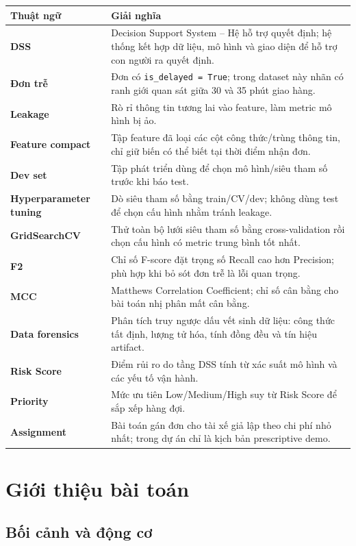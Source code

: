 \documentclass[12pt,a4paper,oneside]{report}
\newcommand{\code}[1]{\nolinkurl{#1}}
\begin{document}
\begin{longtable}{>{\bfseries}p{4.0cm}p{10.2cm}}
\toprule
\textmd{\bfseries Thuật ngữ} & \textbf{Giải nghĩa}\\
\midrule
\endhead
DSS & Decision Support System -- Hệ hỗ trợ quyết định; hệ thống kết hợp dữ
liệu, mô hình và giao diện để hỗ trợ con người ra quyết định.\\
Đơn trễ & Đơn có \code{is\_delayed = True}; trong dataset này nhãn có ranh
giới quan sát giữa 30 và 35 phút giao hàng.\\
Leakage & Rò rỉ thông tin tương lai vào feature, làm metric mô hình bị ảo.\\
Feature compact & Tập feature đã loại các cột công thức/trùng thông tin, chỉ
giữ biến có thể biết tại thời điểm nhận đơn.\\
Dev set & Tập phát triển dùng để chọn mô hình/siêu tham số trước khi báo test.\\
Hyperparameter tuning & Dò siêu tham số bằng train/CV/dev; không dùng test để
chọn cấu hình nhằm tránh leakage.\\
GridSearchCV & Thử toàn bộ lưới siêu tham số bằng cross-validation rồi chọn cấu
hình có metric trung bình tốt nhất.\\
F2 & Chỉ số F-score đặt trọng số Recall cao hơn Precision; phù hợp khi bỏ sót
đơn trễ là lỗi quan trọng.\\
MCC & Matthews Correlation Coefficient; chỉ số cân bằng cho bài toán nhị phân
mất cân bằng.\\
Data forensics & Phân tích truy ngược dấu vết sinh dữ liệu: công thức tất định,
lượng tử hóa, tính đồng đều và tín hiệu artifact.\\
Risk Score & Điểm rủi ro do tầng DSS tính từ xác suất mô hình và các yếu tố
vận hành.\\
Priority & Mức ưu tiên Low/Medium/High suy từ Risk Score để sắp xếp hàng đợi.\\
Assignment & Bài toán gán đơn cho tài xế giả lập theo chi phí nhỏ nhất; trong
dự án chỉ là kịch bản prescriptive demo.\\
\bottomrule
\end{longtable}

\tableofcontents
\listoffigures
\cleardoublepage
{}

\chapter{Giới thiệu bài toán}

\section{Bối cảnh và động cơ}
\end{document}

